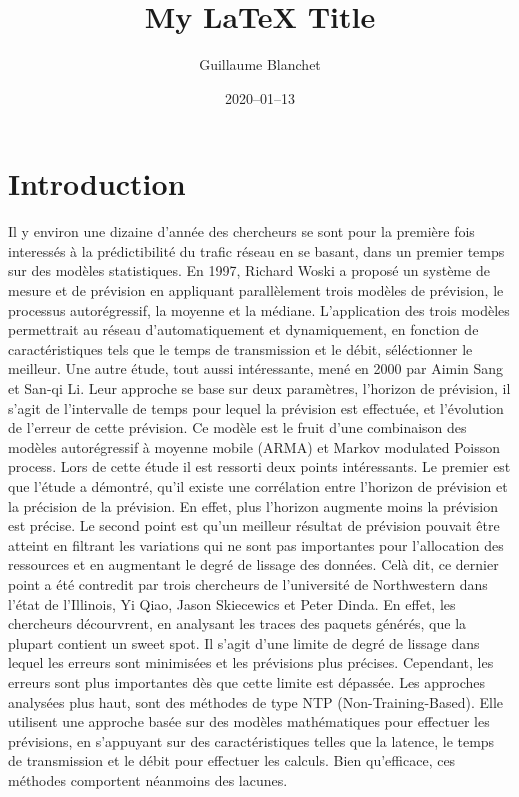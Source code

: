\documentclass[12pt]{article}
\title{My LaTeX Title}
\author{Guillaume Blanchet}
\date{2020–01–13}
\begin{document}
\maketitle

\section{Introduction}

Il y environ une dizaine d'année des chercheurs se sont pour la première fois interessés à la prédictibilité du trafic réseau en se basant, dans un premier temps sur des modèles statistiques.
En 1997, Richard Woski a proposé un système de mesure et de prévision en appliquant parallèlement trois modèles de prévision, le processus autorégressif, la moyenne et la médiane.
L'application des trois modèles permettrait au réseau d'automatiquement et dynamiquement, en fonction de caractéristiques tels que le temps de transmission et le débit, séléctionner le meilleur.
Une autre étude, tout aussi intéressante, mené en 2000 par Aimin Sang et San-qi Li. 
Leur approche se base sur deux paramètres, l'horizon de prévision, il s'agit de l'intervalle de temps pour lequel la prévision est effectuée, et l'évolution de l'erreur de cette prévision.
Ce modèle est le fruit d'une combinaison des modèles autorégressif à moyenne mobile (ARMA) et Markov modulated Poisson process.
Lors de cette étude il est ressorti deux points intéressants. Le premier est que l'étude a démontré, qu'il existe une corrélation entre l'horizon de prévision et la précision de la prévision.
En effet, plus l'horizon augmente moins la prévision est précise. Le second point est qu'un meilleur résultat de prévision pouvait être atteint en filtrant les variations qui ne sont pas importantes pour l'allocation des ressources et en augmentant le degré de lissage des données.
Celà dit, ce dernier point a été contredit par trois chercheurs de l'université de Northwestern dans l'état de l'Illinois, Yi Qiao, Jason Skiecewics et Peter Dinda.
En effet, les chercheurs décourvrent, en analysant les traces des paquets générés, que la plupart contient un sweet spot. Il s'agit d'une limite de degré de lissage dans lequel les erreurs sont minimisées et les prévisions plus précises. Cependant, les erreurs sont plus importantes dès que cette limite est dépassée.
Les approches analysées plus haut, sont des méthodes de type NTP (Non-Training-Based). Elle utilisent une approche basée sur des modèles mathématiques pour effectuer les prévisions, en s'appuyant sur des caractéristiques telles que la latence, le temps de transmission et le débit pour effectuer les calculs. Bien qu'efficace, ces méthodes comportent néanmoins des lacunes.
\end{document}
